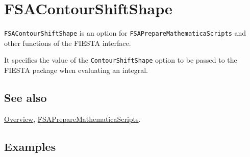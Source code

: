 \documentclass[../FeynHelpersManual.tex]{subfiles}
\begin{document}
\hypertarget{fsacontourshiftshape}{
\section{FSAContourShiftShape}\label{fsacontourshiftshape}}

\texttt{FSAContourShiftShape} is an option for
\texttt{FSAPrepareMathematicaScripts} and other functions of the FIESTA
interface.

It specifies the value of the \texttt{ContourShiftShape} option to be
passed to the FIESTA package when evaluating an integral.

\subsection{See also}

\hyperlink{toc}{Overview},
\hyperlink{fsapreparemathematicascripts}{FSAPrepareMathematicaScripts}.

\subsection{Examples}
\end{document}

